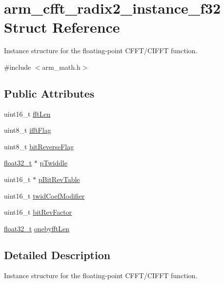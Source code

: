 \hypertarget{structarm__cfft__radix2__instance__f32}{}\section{arm\+\_\+cfft\+\_\+radix2\+\_\+instance\+\_\+f32 Struct Reference}
\label{structarm__cfft__radix2__instance__f32}


Instance structure for the floating-\/point C\+F\+F\+T/\+C\+I\+F\+FT function.  




{\ttfamily \#include $<$arm\+\_\+math.\+h$>$}

\subsection*{Public Attributes}
\begin{DoxyCompactItemize}
\item 
uint16\+\_\+t \hyperlink{structarm__cfft__radix2__instance__f32_a2f915a1c29635c1623086aaaa726be8f}{fft\+Len}
\item 
uint8\+\_\+t \hyperlink{structarm__cfft__radix2__instance__f32_a8dbe98d2c924e35e0a3fed2fe948176f}{ifft\+Flag}
\item 
uint8\+\_\+t \hyperlink{structarm__cfft__radix2__instance__f32_af713b4ac5256a19bc965c89fe3005fa3}{bit\+Reverse\+Flag}
\item 
\hyperlink{arm__math_8h_a4611b605e45ab401f02cab15c5e38715}{float32\+\_\+t} $\ast$ \hyperlink{structarm__cfft__radix2__instance__f32_adb0c9d47dbfbd90a6f6ed0a05313a974}{p\+Twiddle}
\item 
uint16\+\_\+t $\ast$ \hyperlink{structarm__cfft__radix2__instance__f32_a92b8fa0a151cd800436094903a5ca0a4}{p\+Bit\+Rev\+Table}
\item 
uint16\+\_\+t \hyperlink{structarm__cfft__radix2__instance__f32_a411f75b6ed01690293f4f5988030ea42}{twid\+Coef\+Modifier}
\item 
uint16\+\_\+t \hyperlink{structarm__cfft__radix2__instance__f32_ac1688dafa5177f6b1505abbfd0cf8b21}{bit\+Rev\+Factor}
\item 
\hyperlink{arm__math_8h_a4611b605e45ab401f02cab15c5e38715}{float32\+\_\+t} \hyperlink{structarm__cfft__radix2__instance__f32_a1d3d289d47443e597d88a40effd14b8f}{onebyfft\+Len}
\end{DoxyCompactItemize}


\subsection{Detailed Description}
Instance structure for the floating-\/point C\+F\+F\+T/\+C\+I\+F\+FT function. 

